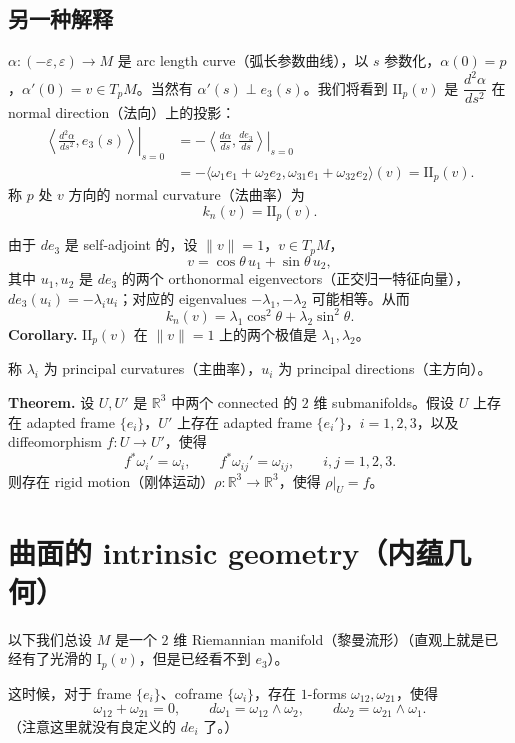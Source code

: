 \documentclass[UTF8,11pt,a4paper]{ctexart}
\begin{document}
\subsection*{另一种解释}
$\alpha\colon(-\varepsilon,\varepsilon)\longrightarrow M$ 是 arc length curve（弧长参数曲线），以 $s$ 参数化，$\alpha(0)=p$，$\alpha'(0)=v\in T_pM$。当然有 $\alpha'(s)\perp e_3(s)$。我们将看到 $\mathrm{II}_p(v)$ 是 $\dfrac{d^2\alpha}{ds^2}$ 在 normal direction（法向）上的投影：
\begin{align*}
\left.\left\langle\frac{d^2\alpha}{ds^2},e_3(s)\right\rangle\right|_{s=0}
&=-\left.\left\langle\frac{d\alpha}{ds},\frac{de_3}{ds}\right\rangle\right|_{s=0}\\
&=-\langle\omega_1e_1+\omega_2e_2,
\omega_{31}e_1+\omega_{32}e_2\rangle(v)
=\mathrm{II}_p(v).
\end{align*}
称 $p$ 处 $v$ 方向的 normal curvature（法曲率）为
\[
k_n(v)=\mathrm{II}_p(v).
\]

由于 $de_3$ 是 self-adjoint 的，设 $\|v\|=1$，$v\in T_pM$，
\[
v=\cos\theta\,u_1+\sin\theta\,u_2,
\]
其中 $u_1,u_2$ 是 $de_3$ 的两个 orthonormal eigenvectors（正交归一特征向量），$de_3(u_i)=-\lambda_i u_i$；对应的 eigenvalues $-\lambda_1,-\lambda_2$ 可能相等。从而
\[
k_n(v)=\lambda_1\cos^2\theta+\lambda_2\sin^2\theta.
\]
\textbf{Corollary.} $\mathrm{II}_p(v)$ 在 $\|v\|=1$ 上的两个极值是 $\lambda_1,\lambda_2$。

称 $\lambda_i$ 为 principal curvatures（主曲率），$u_i$ 为 principal directions（主方向）。


\medskip
\textbf{Theorem.} 设 $U,U'$ 是 $\mathbb{R}^3$ 中两个 connected 的 $2$ 维 submanifolds。假设 $U$ 上存在 adapted frame $\{e_i\}$，$U'$ 上存在 adapted frame $\{e_i'\}$，$i=1,2,3$，以及 diffeomorphism $f\colon U\to U'$，使得
\[
f^*\omega_i'=\omega_i,
\qquad
f^*\omega_{ij}'=\omega_{ij},
\qquad i,j=1,2,3.
\]
则存在 rigid motion（刚体运动）$\rho\colon\mathbb{R}^3\to\mathbb{R}^3$，使得 $\rho|_U=f$。
\section{曲面的 intrinsic geometry（内蕴几何）}
以下我们总设 $M$ 是一个 $2$ 维 Riemannian manifold（黎曼流形）（直观上就是已经有了光滑的 $\mathrm{I}_p(v)$，但是已经看不到 $e_3$）。

这时候，对于 frame $\{e_i\}$、coframe $\{\omega_i\}$，存在 $1$-forms $\omega_{12},\omega_{21}$，使得
\[
\omega_{12}+\omega_{21}=0,
\qquad
d\omega_1=\omega_{12}\wedge\omega_2,
\qquad
d\omega_2=\omega_{21}\wedge\omega_1.
\]
（注意这里就没有良定义的 $de_i$ 了。）
\end{document}
